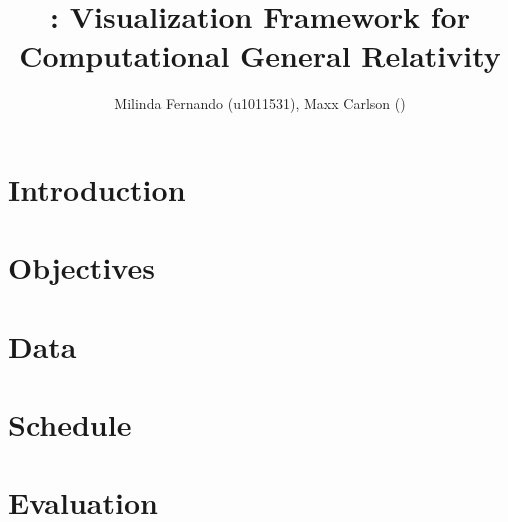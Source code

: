 \documentclass[a4paper,10pt]{article}
\title{\grvis : Visualization Framework for Computational General Relativity}
\author{Milinda Fernando (u1011531), Maxx Carlson ()}
\begin{document}
\maketitle

\section{Introduction}


\section{Objectives}

\section{Data}

\section{Schedule}

\section{Evaluation}


\end{document}
